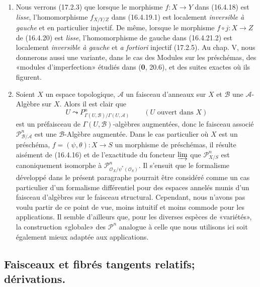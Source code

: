 \begin{remarks}[16.4.24]
\label{IV.16.4.24}
\begin{enumerate}
\item[(i)] Nous verrons (17.2.3) que lorsque le morphisme $f:X\to Y$ dans
(16.4.18) est \emph{lisse}, l'homomorphisme $f_{X/Y/Z}$ dans (16.4.19.1) est
localement \emph{inversible à gauche} et en particulier injectif. De même,
lorsque le morphisme $f\circ j:X\to Z$ de (16.4.20) est \emph{lisse},
l'homomorphisme de gauche dans (16.4.21.2) est localement
\emph{inversible à gauche} et \emph{a fortiori} injectif (17.2.5). Au chap. V,
nous donnerons aussi une variante, dans le cas des Modules sur les
préschémas, des «modules d'imperfection» étudiés dans (\textbf{0}, 20.6), et des suites
exactes où ils figurent.

\item[(ii)] Soient $X$ un espace topologique, $\mathscr{A}$ un faisceau
d'anneaux sur $X$ et $\mathscr{B}$ une $\mathscr{A}$-Algèbre sur $X$. Alors il
est clair que
\[
  U\leadsto
  P_{\Gamma(U,\mathscr{B})/\Gamma(U,\mathscr{A})}^n
  \qquad (U\text{ ouvert dans }X)
\]
est un préfaisceau de $\Gamma(U,\mathscr{B})$-algèbres augmentées, donc le
faisceau associé $\mathscr{P}_{\mathscr{B}/\mathscr{A}}^n$ est une
$\mathscr{B}$-Algèbre augmentée. Dans le cas particulier où $X$ est un
préschéma, $f=(\psi,\theta):X\to S$ un morphisme de préschémas, il résulte
aisément de (16.4.16) et de l'exactitude du foncteur $\varinjlim$ que
$\mathscr{P}_{X/S}^n$ est canoniquement isomorphe à
$\mathscr{P}_{\mathcal{O}_X/\psi^*(\mathcal{O}_S)}^n$. Il s'ensuit que le
formalisme développé dans le présent paragraphe pourrait être considéré comme
un
cas particulier d'un formalisme différentiel pour des espaces annelés munis
d'un faisceau d'algèbres sur le faisceau structural. Cependant, nous n'avons
pas voulu partir de ce point de vue, moins intuitif et moins commode pour les
applications. Il semble d'ailleurs que, pour les diverses espèces de
«variétés», la construction «globale» des $\mathscr{P}^n$ analogue à celle que
nous utilisons ici soit également mieux adaptée aux applications.
\end{enumerate}
\end{remarks}

\subsection{Faisceaux et fibrés tangents relatifs; dérivations.}

